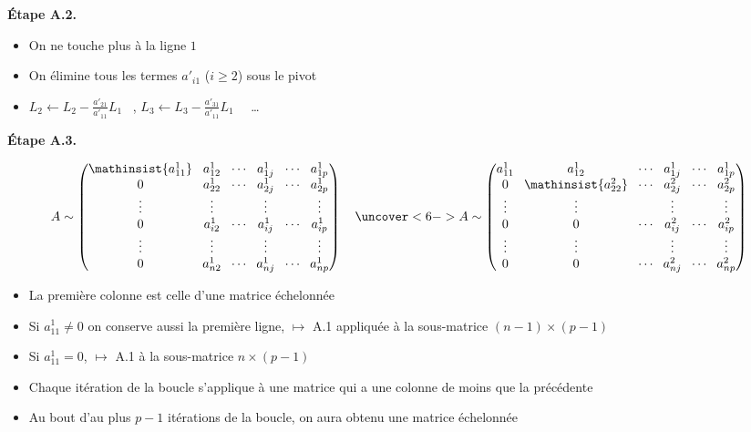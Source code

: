 \begin{frame}
\pause
\textbf{\'Etape A.2.}  

\pause
\begin{itemize}
  \item On ne touche plus à la ligne $1$
  \pause
  \item On élimine tous les termes $a'_{i1}$ ($i\ge 2$) sous le pivot
  \pause
  \item $L_2 \leftarrow L_2 - \frac{a'_{21}}{a'_{11}}L_1$ \, ,\quad 
$L_3 \leftarrow L_3 - \frac{a'_{31}}{a'_{11}}L_1$ \ \ \ldots 
\end{itemize}

\end{frame}



\begin{frame}

\textbf{\'Etape A.3.}  

\pause
{\small
$$
\arraycolsep=1.4mm
A \sim \begin{pmatrix}
\mathinsist{a^1_{11}}&a^1_{12}&\cdots&a^1_{1j}&\cdots&a^1_{1p}\\
0&a^1_{22}&\cdots&a^1_{2j}&\cdots&a^1_{2p}\\
\vdots&\vdots&&\vdots&&\vdots\\
0&a^1_{i2}&\cdots&a^1_{ij}&\cdots&a^1_{ip}\\
\vdots&\vdots&&\vdots&&\vdots\\
0&a^1_{n2}&\cdots&a^1_{nj}&\cdots&a^1_{np}\\
\end{pmatrix}
\quad 
\uncover<6->{
A \sim 
\begin{pmatrix}
a^1_{11}&a^1_{12}&\cdots&a^1_{1j}&\cdots&a^1_{1p}\\
0&\mathinsist{a^2_{22}}&\cdots&a^2_{2j}&\cdots&a^2_{2p}\\
\vdots&\vdots&&\vdots&&\vdots\\
0&0&\cdots&a^2_{ij}&\cdots&a^2_{ip}\\
\vdots&\vdots&&\vdots&&\vdots\\
0&0&\cdots&a^2_{nj}&\cdots&a^2_{np}\\
\end{pmatrix}}
$$}

\pause
\begin{itemize}
  \item La première colonne est celle d'une matrice échelonnée
  \pause
  \item Si $a^1_{11}\neq0$ on conserve aussi la première ligne, $\mapsto$ A.1
  appliquée à la sous-matrice $(n-1)\times(p-1)$
  \pause
  \item Si $a^1_{11}=0$, $\mapsto$ A.1 à la sous-matrice 
$n\times(p-1)$
  \pause\pause
  \item Chaque itération de la boucle s'applique à une matrice qui a 
une colonne de moins que la précédente
  \pause 
  \item Au bout d'au 
plus $p-1$ itérations de la boucle, on aura obtenu une 
matrice échelonnée
\end{itemize}
\end{frame}



